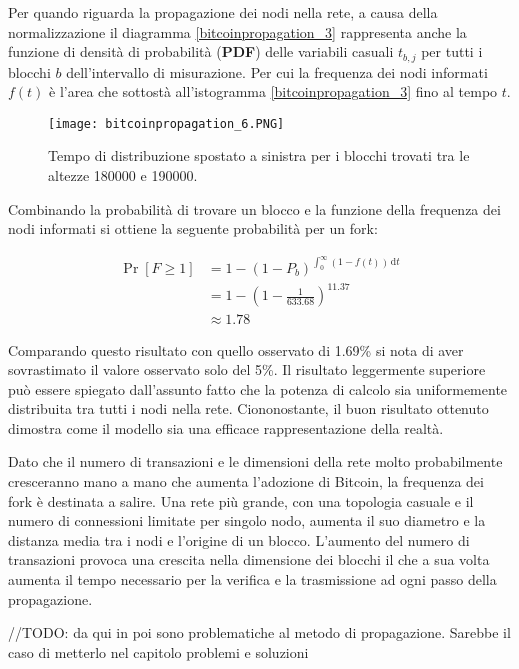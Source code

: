 Per quando riguarda la propagazione dei nodi nella rete, a causa della
normalizzazione il diagramma \ref{bitcoinpropagation_3} rappresenta
anche la funzione di densità di probabilità (\textbf{PDF}) delle
variabili casuali $t_{b,j}$ per tutti i blocchi $b$ dell'intervallo di
misurazione. Per cui la frequenza dei nodi informati $f(t)$ è l'area che
sottostà all'istogramma \ref{bitcoinpropagation_3} fino al tempo $t$.

\begin{figure}[htbp]
\centering
\texttt{[image: bitcoinpropagation\_6.PNG]}
\caption{Tempo di distribuzione spostato a sinistra per i blocchi
trovati tra le altezze 180000 e 190000.\label{bitcoinpropagation_6}}
\end{figure}

Combinando la probabilità di trovare un blocco e la funzione della
frequenza dei nodi informati si ottiene la seguente probabilità per un
fork:

\[
\begin{align}
    \Pr\left[F \geq 1\right] &= 1 - (1 - P_b)^{\int_{0}^{\infty} \! (1 - f(t)) \, \mathrm{d}t} \\
    &= 1 - \left(1 - \frac{1}{633.68}\right)^{11.37} \\
    &\approx 1.78%
\end{align}
\]

Comparando questo risultato con quello osservato di 1.69\% si nota di
aver sovrastimato il valore osservato solo del 5\%. Il risultato
leggermente superiore può essere spiegato dall'assunto fatto che la
potenza di calcolo sia uniformemente distribuita tra tutti i nodi nella
rete. Ciononostante, il buon risultato ottenuto dimostra come il modello
sia una efficace rappresentazione della realtà.

Dato che il numero di transazioni e le dimensioni della rete molto
probabilmente cresceranno mano a mano che aumenta l'adozione di Bitcoin,
la frequenza dei fork è destinata a salire. Una rete più grande, con una
topologia casuale e il numero di connessioni limitate per singolo nodo,
aumenta il suo diametro e la distanza media tra i nodi e l'origine di un
blocco. L'aumento del numero di transazioni provoca una crescita nella
dimensione dei blocchi il che a sua volta aumenta il tempo necessario
per la verifica e la trasmissione ad ogni passo della propagazione.

//TODO: da qui in poi sono problematiche al metodo di propagazione.
Sarebbe il caso di metterlo nel capitolo problemi e soluzioni

